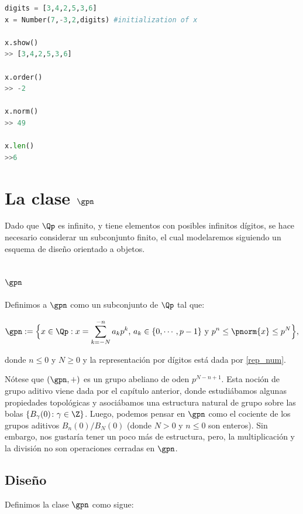 \begin{lstlisting}[language=Python, caption = Instancia de la clase Número   (Number)]
digits = [3,4,2,5,3,6]
x = Number(7,-3,2,digits) #initialization of x

x.show()
>> [3,4,2,5,3,6]

x.order()
>> -2

x.norm()
>> 49

x.len()
>>6
\end{lstlisting}



\section{La clase $\gpn$ }

Dado que $\Qp$ es infinito, y tiene elementos con posibles infinitos dígitos, se hace necesario considerar un subconjunto finito, el cual modelaremos siguiendo un esquema de diseño orientado a objetos.
\subsection{$\gpn$}

Definimos a $\gpn$ como un subconjunto de $\Qp$ tal que:



\begin{equation}\label{GpnN}
\gpn := \Big\{x\in \Qp : x = \sum_{k=-N}^{-n} a_{k} p^{k} \text{, $a_k\in \{0,\cdots,p-1\}$ y } p^{n}\leq \pnorm{x}\leq p^N\Big \},
\end{equation}

donde $n\leq0$ y $N\geq 0$ y la representación por dígitos está dada por \ref{rep_num}.

Nótese que  $   (\gpn,+)$ es un grupo abeliano de oden $p^{N-n+1}$. Esta noción de grupo aditivo viene dada por el capítulo anterior, donde estudiábamos algunas propiedades topológicas y asociábamos una estructura natural de grupo sobre las bolas $\{B_\gamma   (0)\colon\gamma\in\Z\}$. Luego, podemos pensar en $\gpn$ como el cociente de los grupos aditivos $B_n   (0)/B_N   (0)$   (donde $N>0$ y $n\leq0$ son enteros). Sin embargo, nos gustaría tener un poco más de estructura, pero, la  multiplicación y la división no son operaciones cerradas en $\gpn$.

\subsection{Diseño}
Definimos la clase $\gpn$ como sigue:

